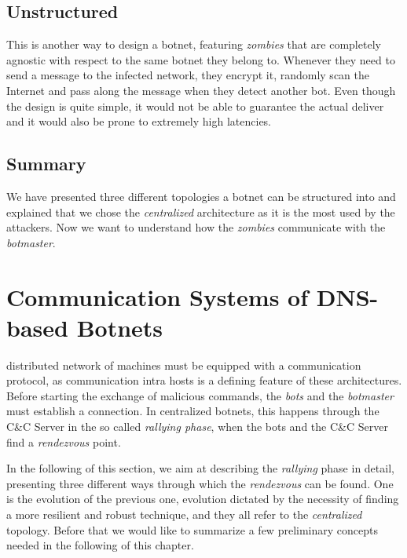 \subsection{Unstructured} %
\label{sub:unstructured}
This is another way to design a botnet, featuring \emph{zombies} that are
completely agnostic with respect to the same botnet they belong to. Whenever
they need to send a message to the infected network, they encrypt it, randomly
scan the Internet and pass along the message when they detect another bot.
Even though the design is quite simple, it would not be able to guarantee the
actual deliver and it would also be prone to extremely high latencies.

\subsection*{Summary} %
\label{sub:topology_summary}
We have presented three different topologies a botnet can be structured into and
explained that we chose the \emph{centralized} architecture as it is the most
used by the attackers. Now we want to understand how the \emph{zombies}
communicate with the \emph{botmaster}.



\section{Communication Systems of DNS-based Botnets} %
\label{sec:botnets_communications}
 distributed network of machines must be equipped with
a communication protocol, as communication intra hosts is a defining feature
of these architectures. Before starting the exchange of malicious commands, the
\emph{bots} and the \emph{botmaster} must establish a connection. In centralized botnets, this happens through the C\&C Server
in the so called \emph{rallying phase}, when the bots and the C\&C Server find a
\emph{rendezvous} point.

In the following of this section, we aim at describing the \emph{rallying} phase
in detail, presenting three different ways through which the \emph{rendezvous}
can be found. One is the evolution of the previous one, evolution dictated by the
necessity of finding a more resilient and robust technique, and they all refer
to the \emph{centralized} topology.
Before that we would like to summarize a few preliminary concepts needed in the
following of this chapter.


